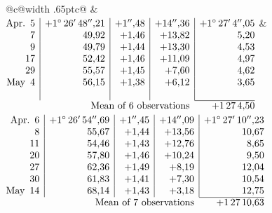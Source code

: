 \noindent\begin{tabular}{@{}c@{\hspace{.4em}\vrule width .65pt\hspace{.4em}}c@{}}
 &
 \\[.18ex]
\(\begin{array}[t]{@{}r|r|r|r|r@{}}
\text{Apr.}\enspace 5 & +1^\circ\,26'\,48''{,}21 & +1''{,}48 & +14''{,}36 & +1^\circ\,27'\,4''{,}05\\
7 & 49{,}92 & +1{,}46 & +13{,}82 & 5{,}20\\
9 & 49{,}79 & +1{,}44 & +13{,}30 & 4{,}53\\
17 & 52{,}42 & +1{,}46 & +11{,}09 & 4{,}97\\
29 & 55{,}57 & +1{,}45 & +7{,}60 & 4{,}62\\
\text{May}\enspace 4 & 56{,}15 & +1{,}38 & +6{,}12 & 3{,}65\\
 & & & & \\
\cline{5-5}
\multicolumn{4}{r}{\text{Mean of 6 observations}} & +1\,27\,4{,}50
\end{array}\)
&
\(\begin{array}[t]{@{}r|r|r|r|r@{}}
\text{Apr.}\enspace 6 & +1^\circ\,26'\,54''{,}69 & +1''{,}45 & +14''{,}09 & +1^\circ\,27'\,10''{,}23\\
8 & 55{,}67 & +1{,}44 & +13{,}56 & 10{,}67\\
11 & 54{,}46 & +1{,}43 & +12{,}76 & 8{,}65\\
20 & 57{,}80 & +1{,}46 & +10{,}24 & 9{,}50\\
27 & 62{,}36 & +1{,}49 & +8{,}19 & 12{,}04\\
30 & 61{,}83 & +1{,}41 & +7{,}30 & 10{,}54\\
\text{May}\enspace 14 & 68{,}14 & +1{,}43 & +3{,}18 & 12{,}75\\
\cline{5-5}
\multicolumn{4}{r}{\text{Mean of 7 observations}} & +1\,27\,10{,}63
\end{array}\)
\end{tabular}\par\medskip
